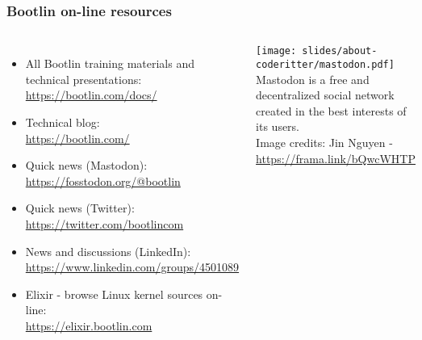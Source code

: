 \begin{frame}
\frametitle{Bootlin on-line resources}
\begin{columns}
  \begin{itemize}
    \item All Bootlin training materials and technical presentations:\\
          \url{https://bootlin.com/docs/}
    \item Technical blog:\\
          \url{https://bootlin.com/}
    \item Quick news (Mastodon):\\
          \url{https://fosstodon.org/@bootlin}
    \item Quick news (Twitter):\\
          \url{https://twitter.com/bootlincom}
    \item News and discussions (LinkedIn):\\
	  \url{https://www.linkedin.com/groups/4501089}
    \item Elixir - browse Linux kernel sources on-line:\\
          \url{https://elixir.bootlin.com}
  \end{itemize}
  \texttt{[image: slides/about-coderitter/mastodon.pdf]}\\
  \vspace{3cm}
  \small Mastodon is a free and decentralized social network created
  in the best interests of its users.\\
  \vspace{0.5cm}
  \tiny Image credits: Jin Nguyen - \url{https://frama.link/bQwcWHTP}
\end{columns}
\end{frame}
